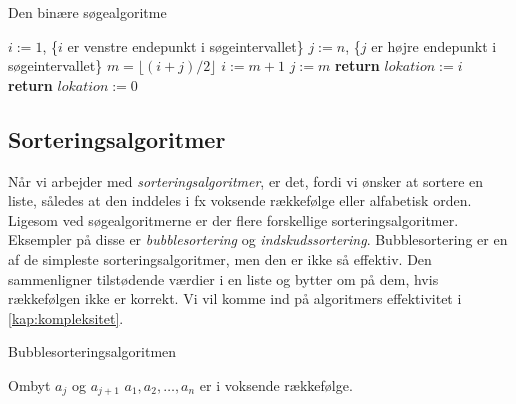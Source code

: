 \begin{algorithm}[H]
\caption{Den binære søgealgoritme}
\begin{algorithmic}[1]

    \State $i:=1$, \{$i$ er venstre endepunkt i søgeintervallet\}
    \State $j:=n$, \{$j$ er højre endepunkt i søgeintervallet\}
        \State $m=\lfloor (i+j)/2 \rfloor$
    		\State $i:=m+1$
    		\Else
    		\State $j:=m$
    		\EndIf    
    \EndWhile
    	\State \textbf{return} $lokation:=i$
    \Else
    	\State \textbf{return} $lokation:=0$
    \EndIf
  \label{roy's loop}
\EndProcedure

\end{algorithmic}
\label{alg:binaer}
\end{algorithm}

\subsection{Sorteringsalgoritmer} \label{kap:sortering}
Når vi arbejder med \emph{sorteringsalgoritmer}, er det, fordi vi ønsker at sortere en liste, således at den inddeles i fx voksende rækkefølge eller alfabetisk orden. Ligesom ved søgealgoritmerne er der flere forskellige sorteringsalgoritmer. Eksempler på disse er \emph{bubblesortering} og \emph{indskudssortering}. Bubblesortering er en af de simpleste sorteringsalgoritmer, men den er ikke så effektiv. Den sammenligner tilstødende værdier i en liste og bytter om på dem, hvis rækkefølgen ikke er korrekt. Vi vil komme ind på algoritmers effektivitet i \autoref{kap:kompleksitet}.

\begin{algorithm}[H]
\caption{Bubblesorteringsalgoritmen}
\begin{algorithmic}[1]

\EndProcedure
{}
    			\State Ombyt $a_{j}$ og $a_{j+1}$ 	
\EndIf
\EndFor
\EndFor
\State $a_{1},a_{2},\dotsc,a_{n}$ er i voksende rækkefølge. 

\end{algorithmic}
\end{algorithm}



